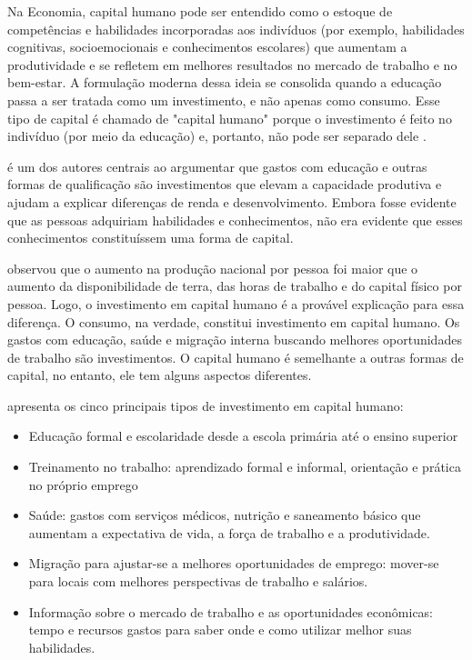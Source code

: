 \documentclass[
	12pt,				%
	openright,			%
	oneside,			%
	a4paper,			%
	brazil,				%
	]{article}
\begin{document}
Na Economia, capital humano pode ser entendido como o estoque de competências e
habilidades incorporadas aos indivíduos (por exemplo, habilidades cognitivas,
socioemocionais e conhecimentos escolares) que aumentam a produtividade e se
refletem em melhores resultados no mercado de trabalho e no bem-estar. A
formulação moderna dessa ideia se consolida quando a educação passa a ser
tratada como um investimento, e não apenas como consumo. Esse tipo de capital é
chamado de "capital humano" porque o investimento é feito no indivíduo 
(por meio da educação) e, portanto, não pode ser separado dele \cite[16]{Becker1975_HumanCapital}.

\textcite{schultz1961} é um dos autores centrais ao argumentar que gastos com
educação e outras formas de qualificação são investimentos que elevam a
capacidade produtiva e ajudam a explicar diferenças de renda e desenvolvimento.
Embora fosse evidente que as pessoas adquiriam habilidades e conhecimentos, não
era evidente que esses conhecimentos constituíssem uma forma de capital.

\textcite{schultz1961} observou que o aumento na produção nacional por pessoa
foi maior que o aumento da disponibilidade de terra, das horas de trabalho e do
capital físico por pessoa. Logo, o investimento em capital humano é a provável
explicação para essa diferença. O consumo, na verdade, constitui investimento em capital humano. Os
gastos com educação, saúde e migração interna buscando melhores oportunidades de
trabalho são investimentos. O capital humano é semelhante a outras formas de
capital, no entanto, ele tem alguns aspectos diferentes.

\textcite[9]{schultz1961} apresenta os cinco principais tipos de investimento
em capital humano:

\begin{itemize}
  \item Educação formal e escolaridade desde a escola primária até o ensino
  superior
  \item Treinamento no trabalho: aprendizado formal e informal, orientação e
  prática no próprio emprego
  \item Saúde: gastos com serviços médicos, nutrição e saneamento básico que
  aumentam a expectativa de vida, a força de trabalho e a produtividade.
  \item Migração para ajustar-se a melhores oportunidades de emprego: mover-se
  para locais com melhores perspectivas de trabalho e salários.
  \item Informação sobre o mercado de trabalho e as oportunidades econômicas:
  tempo e recursos gastos para saber onde e como utilizar melhor suas
  habilidades.
\end{itemize}
\end{document}
